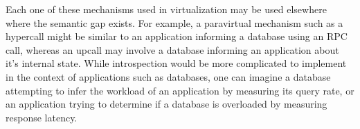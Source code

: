 \documentclass[11pt]{article}
\begin{document}

Each one of these mechanisms used in virtualization may be used elsewhere where the semantic gap exists. For example,
a paravirtual mechanism such as a hypercall might be similar to an application informing a database using an RPC call, whereas an upcall may involve
a database informing an application about it's internal state. While introspection would be more complicated to implement
in the context of applications such as databases, one can imagine a database attempting to infer the workload of
an application by measuring its query rate, or an application trying to determine if a database is overloaded by
measuring response latency.
\end{document}
